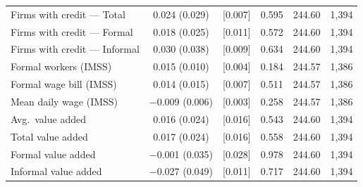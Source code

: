 \begin{threeparttable}
\begin{tabular}{lccccr}
        Firms with credit --- Total     & \phantom{$-$}0.024          (0.029) & [0.007]\sym{***} & 0.595 & 244.60 & 1{,}394 \\
        Firms with credit --- Formal    & \phantom{$-$}0.018          (0.025) & [0.011]\sym{*}   & 0.572 & 244.60 & 1{,}394 \\
        Firms with credit --- Informal  & \phantom{$-$}0.030          (0.038) & [0.009]\sym{***} & 0.634 & 244.60 & 1{,}394 \\
        \midrule
        Formal workers (IMSS)           & \phantom{$-$}0.015          (0.010) & [0.004]\sym{***} & 0.184 & 244.57 & 1{,}386 \\
        Formal wage bill (IMSS)         & \phantom{$-$}0.014          (0.015) & [0.007]\sym{**}  & 0.511 & 244.57 & 1{,}386 \\
        Mean daily wage (IMSS)          & $-$0.009          (0.006) & [0.003]\sym{***} & 0.258 & 244.57 & 1{,}386 \\
        Avg.\ value added               & \phantom{$-$}0.016          (0.024) & [0.016]          & 0.543 & 244.60 & 1{,}394 \\
        Total value added               & \phantom{$-$}0.017          (0.024) & [0.016]          & 0.558 & 244.60 & 1{,}394 \\
        Formal value added              & $-$0.001          (0.035) & [0.028]          & 0.978 & 244.60 & 1{,}394 \\
        Informal value added            & $-$0.027          (0.049) & [0.011]\sym{**}  & 0.717 & 244.60 & 1{,}394 \\
        \bottomrule
    \end{tabular}
    \begin{tablenotes}[flushleft]

\end{tablenotes}
\end{threeparttable}
